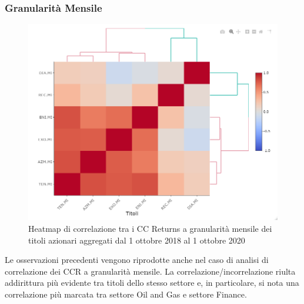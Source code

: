 \documentclass[12pt]{article}
\begin{document}
\subsubsection{Granularità Mensile}
\begin{figure}[!htb]
    \centering
    \includegraphics[width=1\textwidth]{immagini/corr_mont.png}
    \caption{Heatmap di correlazione tra i CC Returns a granularità mensile dei titoli azionari aggregati dal 1 ottobre 2018 al 1 ottobre 2020}
\end{figure}
\FloatBarrier
Le osservazioni precedenti vengono riprodotte anche nel caso di analisi di correlazione dei CCR a granularità mensile. La correlazione/incorrelazione riulta addirittura più evidente tra titoli dello stesso settore e, in particolare, si nota una correlazione più marcata tra settore Oil and Gas e settore Finance.
\newpage
\end{document}
